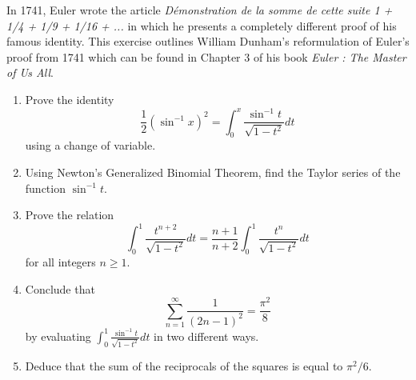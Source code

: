 \begin{exercise} \label{ex: second proof pi2/6}
    In 1741, Euler wrote the article \textit{Démonstration de la somme de cette suite 1 + 1/4 + 1/9 + 1/16 + ...} \cite{eulerE63} in which he presents a completely different proof of his famous identity. This exercise outlines William Dunham's reformulation of Euler's proof from 1741 which can be found in Chapter 3 of his book \textit{Euler : The Master of Us All}.
    \begin{enumerate}[label=(\alph*)]
        \item Prove the identity
        $$\frac{1}{2}(\sin^{-1}x)^2 = \int_{0}^{x}\frac{\sin^{-1}t}{\sqrt{1 - t^2}}dt$$
        using a change of variable.
        \item Using Newton's Generalized Binomial Theorem, find the Taylor series of the function $\sin^{-1}t$.
        \item Prove the relation
        $$\int_{0}^{1}\frac{t^{n+2}}{\sqrt{1-t^2}}dt = \frac{n+1}{n+2}\int_{0}^{1}\frac{t^n}{\sqrt{1-t^2}}dt$$
        for all integers $n \geq 1$.
        \item Conclude that
        $$\sum_{n=1}^{\infty}\frac{1}{(2n-1)^2} = \frac{\pi^2}{8}$$
        by evaluating $ \int_{0}^{1}\frac{\sin^{-1}t}{\sqrt{1 - t^2}}dt$ in two different ways.
        \item Deduce that the sum of the reciprocals of the squares is equal to $\pi^2/6$.
    \end{enumerate}
\end{exercise}